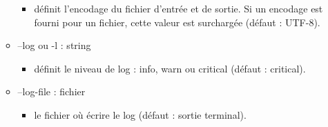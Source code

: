 \documentclass[manual-fr.tex]{subfiles}
\begin{document}
\begin{itemize}
\begin{itemize}
                \begin{itemize}
                    \item[] définit l'encodage du fichier d'entrée et de sortie. Si un encodage est fourni pour un fichier,
                        cette valeur est surchargée (défaut : UTF-8).
                \end{itemize}
            \item[] --log ou -l : string
                \begin{itemize}
                    \item[] définit le niveau de log : info, warn ou critical (défaut : critical).
                \end{itemize}
            \item[] --log-file : fichier
                \begin{itemize}
                    \item[] le fichier où écrire le log (défaut : sortie terminal).
                \end{itemize}
        \end{itemize}
\end{itemize}
\end{document}
